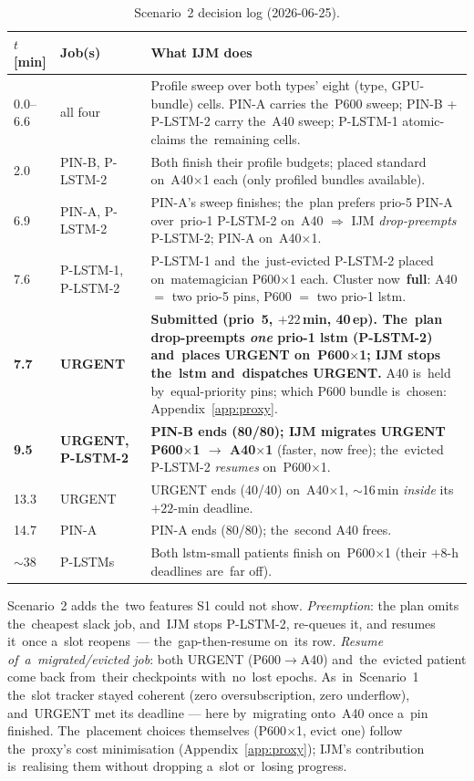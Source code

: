 \begin{table}[H]\centering\scriptsize\setlength{\tabcolsep}{4pt}
\renewcommand{\arraystretch}{1.15}%
\begin{tabular}{@{}l l p{8.4cm}@{}}\toprule
$t$ [min] & Job(s) & What IJM does \\\midrule
0.0--6.6 & all four & Profile sweep over both types' eight (type, GPU-bundle) cells.  PIN-A carries the~P600 sweep; PIN-B + P-LSTM-2 carry the~A40 sweep; P-LSTM-1 atomic-claims the~remaining cells. \\
2.0  & PIN-B, P-LSTM-2 & Both finish their profile budgets; placed standard on~A40$\times$1 each (only profiled bundles available). \\
6.9  & PIN-A, P-LSTM-2 & PIN-A's sweep finishes; the~plan prefers prio-5 PIN-A over~prio-1 P-LSTM-2 on~A40 $\Rightarrow$ IJM \emph{drop-preempts} P-LSTM-2; PIN-A on~A40$\times$1. \\
7.6  & P-LSTM-1, P-LSTM-2 & P-LSTM-1 and~the~just-evicted P-LSTM-2 placed on~matemagician P600$\times$1 each.  Cluster now~\textbf{full}: A40 $=$ two prio-5 pins, P600 $=$ two prio-1 lstm. \\
\textbf{7.7} & \textbf{URGENT} & \textbf{Submitted (prio~5, $+22$\,min, 40\,ep).  The~plan drop-preempts \emph{one} prio-1 lstm (P-LSTM-2) and~places URGENT on~P600$\times$1; IJM stops the~lstm and~dispatches URGENT.}  A40 is~held by~equal-priority pins; which P600 bundle is~chosen: Appendix~\ref{app:proxy}. \\
\textbf{9.5} & \textbf{URGENT, P-LSTM-2} & \textbf{PIN-B ends (80/80); IJM migrates URGENT P600$\times$1 $\to$ A40$\times$1} (faster, now free); the~evicted P-LSTM-2 \emph{resumes} on~P600$\times$1. \\
13.3 & URGENT     & URGENT ends (40/40) on~A40$\times$1, $\sim$16\,min \emph{inside} its~$+22$-min deadline. \\
14.7 & PIN-A      & PIN-A ends (80/80); the~second A40 frees. \\
$\sim$38 & P-LSTMs & Both lstm-small patients finish on~P600$\times$1 (their $+8$-h deadlines are~far off). \\\bottomrule
\end{tabular}
\caption{Scenario~2 decision log (2026-06-25).}\label{tab:e2e-s2-decisions}
\end{table}

Scenario~2 adds the~two features S1 could not show.  \emph{Preemption}: the
plan omits the~cheapest slack job, and~IJM stops P-LSTM-2, re-queues it, and
resumes it~once a~slot reopens~--- the~gap-then-resume on~its row.  \emph{Resume
of~a~migrated/evicted job}: both URGENT (P600$\to$A40) and~the~evicted patient
come back from~their checkpoints with~no~lost epochs.  As~in~Scenario~1 the~slot
tracker stayed coherent (zero oversubscription, zero underflow), and~URGENT met
its deadline --- here by~migrating onto~A40 once a~pin finished.  The~placement
choices themselves (P600$\times$1, evict one) follow the~proxy's
cost minimisation (Appendix~\ref{app:proxy}); IJM's contribution is~realising
them without dropping a~slot or~losing progress.

